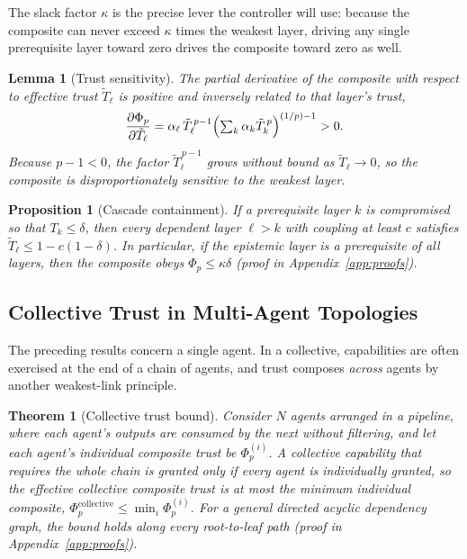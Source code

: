 \documentclass[sigconf,anonymous]{acmart}
\theoremstyle{plain}
\newtheorem{theorem}{Theorem}
\newtheorem{lemma}{Lemma}
\newtheorem{proposition}{Proposition}
\theoremstyle{definition}
\theoremstyle{remark}
\begin{document}
The slack factor $\kappa$ is the precise lever the controller will use: because the
composite can never exceed $\kappa$ times the weakest layer, driving any single
prerequisite layer toward zero drives the composite toward zero as well.

\begin{lemma}[Trust sensitivity]
\label{lem:sensitivity}
The partial derivative of the composite with respect to effective trust $\tilde T_\ell$
is positive and inversely related to that layer's trust,
\begin{equation}
\frac{\partial\Phi_p}{\partial\tilde T_\ell}
= \alpha_\ell\,\tilde T_\ell^{\,p-1}\Bigl(\textstyle\sum_k\alpha_k\tilde T_k^{\,p}\Bigr)^{(1/p)-1}>0.
\label{eq:sensitivity}
\end{equation}
Because $p-1<0$, the factor $\tilde T_\ell^{\,p-1}$ grows without bound as
$\tilde T_\ell\to0$, so the composite is disproportionately sensitive to the weakest
layer.
\end{lemma}

\begin{proposition}[Cascade containment]
\label{prop:cascade}
If a prerequisite layer $k$ is compromised so that $T_k\le\delta$, then every dependent
layer $\ell>k$ with coupling at least $c$ satisfies $\tilde T_\ell\le1-c(1-\delta)$. In
particular, if the epistemic layer is a prerequisite of all layers, then the composite
obeys $\Phi_p\le\kappa\delta$ (proof in Appendix~\ref{app:proofs}).
\end{proposition}

\subsection{Collective Trust in Multi-Agent Topologies}
The preceding results concern a single agent. In a collective, capabilities are often
exercised at the end of a chain of agents, and trust composes \emph{across} agents by
another weakest-link principle.

\begin{theorem}[Collective trust bound]
\label{thm:collective}
Consider $N$ agents arranged in a pipeline, where each agent's outputs are consumed by the
next without filtering, and let each agent's individual composite trust be
$\Phi_p^{(i)}$. A collective capability that requires the whole chain is granted only if
every agent is individually granted, so the effective collective composite trust is at
most the minimum individual composite, $\Phi_p^{\mathrm{collective}}\le\min_i\Phi_p^{(i)}$.
For a general directed acyclic dependency graph, the bound holds along every root-to-leaf
path (proof in Appendix~\ref{app:proofs}).
\end{theorem}
\end{document}
